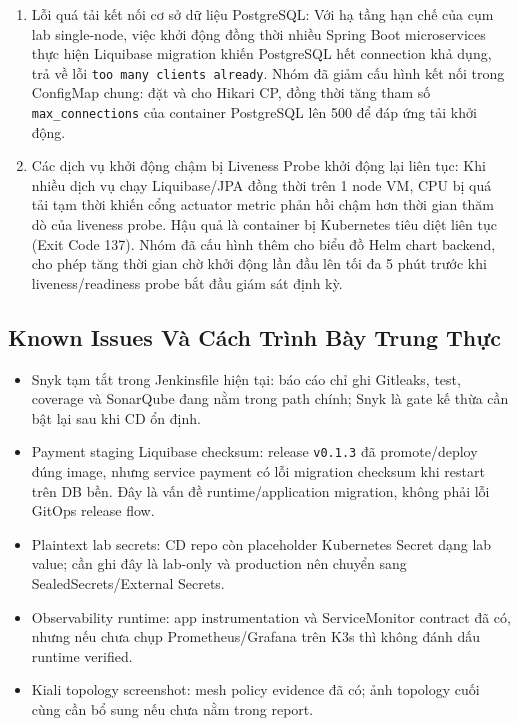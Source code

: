 \begin{enumerate}
    \item Lỗi quá tải kết nối cơ sở dữ liệu PostgreSQL:
    Với hạ tầng hạn chế của cụm lab single-node, việc khởi động đồng thời nhiều Spring Boot microservices thực hiện Liquibase migration khiến PostgreSQL hết connection khả dụng, trả về lỗi \texttt{too many clients already}.
    Nhóm đã giảm cấu hình kết nối trong ConfigMap chung: đặt  và  cho Hikari CP, đồng thời tăng tham số \texttt{max\_connections} của container PostgreSQL lên 500 để đáp ứng tải khởi động.

    \item Các dịch vụ khởi động chậm bị Liveness Probe khởi động lại liên tục:
    Khi nhiều dịch vụ chạy Liquibase/JPA đồng thời trên 1 node VM, CPU bị quá tải tạm thời khiến cổng actuator metric phản hồi chậm hơn thời gian thăm dò của liveness probe. Hậu quả là container bị Kubernetes tiêu diệt liên tục (Exit Code 137).
    Nhóm đã cấu hình thêm  cho biểu đồ Helm chart backend, cho phép tăng thời gian chờ khởi động lần đầu lên tối đa 5 phút trước khi liveness/readiness probe bắt đầu giám sát định kỳ.
\end{enumerate}

\subsection{Known Issues Và Cách Trình Bày Trung Thực}

\begin{itemize}
    \item Snyk tạm tắt trong Jenkinsfile hiện tại: báo cáo chỉ ghi Gitleaks, test, coverage và SonarQube đang nằm trong path chính; Snyk là gate kế thừa cần bật lại sau khi CD ổn định.
    \item Payment staging Liquibase checksum: release \texttt{v0.1.3} đã promote/deploy đúng image, nhưng service payment có lỗi migration checksum khi restart trên DB bền. Đây là vấn đề runtime/application migration, không phải lỗi GitOps release flow.
    \item Plaintext lab secrets: CD repo còn placeholder Kubernetes Secret dạng lab value; cần ghi đây là lab-only và production nên chuyển sang SealedSecrets/External Secrets.
    \item Observability runtime: app instrumentation và ServiceMonitor contract đã có, nhưng nếu chưa chụp Prometheus/Grafana trên K3s thì không đánh dấu runtime verified.
    \item Kiali topology screenshot: mesh policy evidence đã có; ảnh topology cuối cùng cần bổ sung nếu chưa nằm trong report.
\end{itemize}

